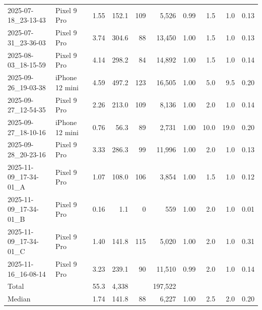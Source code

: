 \begin{tabular}{llrrrrrrrr}
2025-07-18\_23-13-43 & Pixel 9 Pro & 1.55 & 152.1 & 109 & 5{,}526 & 0.99 & 1.5 & 1.0 & 0.13 \\
2025-07-31\_23-36-03 & Pixel 9 Pro & 3.74 & 304.6 & 88 & 13{,}450 & 1.00 & 1.5 & 1.0 & 0.13 \\
2025-08-03\_18-15-59 & Pixel 9 Pro & 4.14 & 298.2 & 84 & 14{,}892 & 1.00 & 1.5 & 1.0 & 0.14 \\
2025-09-26\_19-03-38 & iPhone 12 mini & 4.59 & 497.2 & 123 & 16{,}505 & 1.00 & 5.0 & 9.5 & 0.20 \\
2025-09-27\_12-54-35 & Pixel 9 Pro & 2.26 & 213.0 & 109 & 8{,}136 & 1.00 & 2.0 & 1.0 & 0.14 \\
2025-09-27\_18-10-16 & iPhone 12 mini & 0.76 & 56.3 & 89 & 2{,}731 & 1.00 & 10.0 & 19.0 & 0.20 \\
2025-09-28\_20-23-16 & Pixel 9 Pro & 3.33 & 286.3 & 99 & 11{,}996 & 1.00 & 2.0 & 1.0 & 0.13 \\
2025-11-09\_17-34-01\_A & Pixel 9 Pro & 1.07 & 108.0 & 106 & 3{,}854 & 1.00 & 1.5 & 1.0 & 0.12 \\
2025-11-09\_17-34-01\_B & Pixel 9 Pro & 0.16 & 1.1 & 0 & 559 & 1.00 & 2.0 & 1.0 & 0.01 \\
2025-11-09\_17-34-01\_C & Pixel 9 Pro & 1.40 & 141.8 & 115 & 5{,}020 & 1.00 & 2.0 & 1.0 & 0.31 \\
2025-11-16\_16-08-14 & Pixel 9 Pro & 3.23 & 239.1 & 90 & 11{,}510 & 0.99 & 2.0 & 1.0 & 0.14 \\
\midrule
Total & & 55.3 & 4{,}338 & & 197{,}522 & & & & \\
Median & & 1.74 & 141.8 & 88 & 6{,}227 & 1.00 & 2.5 & 2.0 & 0.20 \\
\bottomrule
\end{tabular}
